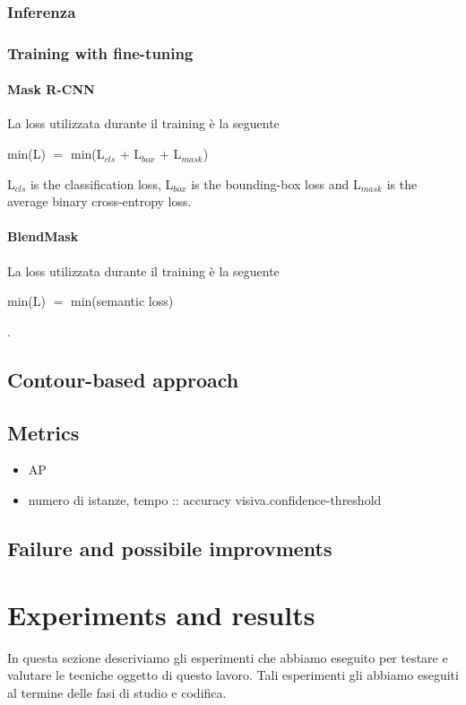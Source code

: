 \documentclass[10pt,twocolumn,letterpaper]{article}
\begin{document}
\subsubsection{Inferenza}
\subsubsection{Training with fine-tuning}
\paragraph{Mask R-CNN}
La loss utilizzata durante il training \`e la seguente
\begin{center} min(L) $=$ min(L$_{cls}$ + L$_{box}$ + L$_{mask}$) \end{center}
L$_{cls}$ is the classification loss, L$_{box}$ is the bounding-box loss and  L$_{mask}$ is the average binary cross-entropy loss.
\paragraph{BlendMask}
La loss utilizzata durante il training \`e la seguente
\begin{center} min(L) $=$ min(semantic loss)~\cite{Authors4_semanticloss}\end{center}.

\subsection{Contour-based approach}
\subsection{Metrics}
\begin{itemize}
\item AP
\item numero di istanze, tempo :: accuracy visiva.confidence-threshold
\end{itemize}
\subsection{Failure and possibile improvments}

\section{Experiments and results}
In questa sezione descriviamo gli esperimenti che abbiamo eseguito per testare  e valutare le tecniche oggetto di questo lavoro. Tali esperimenti gli abbiamo eseguiti al termine delle fasi di studio e codifica.
\end{document}
